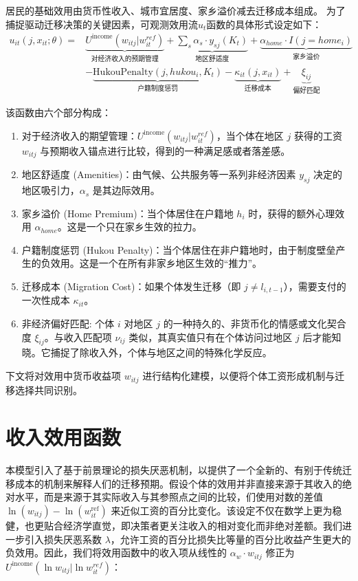 \documentclass[master, final]{zufe-thesis}
\begin{document}
居民的基础效用由货币性收入、城市宜居度、家乡溢价减去迁移成本组成。
为了捕捉驱动迁移决策的关键因素，可观测效用流$u_t$函数的具体形式设定如下：
\begin{equation}
\begin{split}
     u_{it}(j, x_{it}; \theta) = & \underbrace{ U^{\text{income}}(w_{itj} | w_{it}^{ref}) }_{\text{对经济收入的预期管理}} + \underbrace{\sum_s \alpha_s \cdot y_{sj}(K_t)}_{\text{地区舒适度}} + \underbrace{\alpha_{home} \cdot I(j=home_i)}_{\text{家乡溢价}} \\
    & - \underbrace{\text{HukouPenalty}(j, hukou_i, K_t)}_{\text{户籍制度惩罚}} - \underbrace{\kappa_{it}(j, x_{it})}_{\text{迁移成本}} + \underbrace{\xi_{ij}}_{\text{偏好匹配}}
\end{split}
\label{eq:确定性效用函数}
\end{equation}


该函数由六个部分构成：
\begin{enumerate}
  \item 对于经济收入的期望管理：$U^{\text{income}}(w_{itj} | w_{it}^{ref})$，当个体在地区 $j$ 获得的工资 $w_{itj}$ 与预期收入锚点进行比较，得到的一种满足感或者落差感。
  \item 地区舒适度 (Amenities)：由气候、公共服务等一系列非经济因素 $y_{sj}$ 决定的地区吸引力，$\alpha_s$ 是其边际效用。
  \item 家乡溢价 (Home Premium)：当个体居住在户籍地 $h_i$ 时，获得的额外心理效用 $\alpha_{home}$。这是一个只在家乡生效的拉力。
  \item 户籍制度惩罚 (Hukou Penalty)：当个体居住在非户籍地时，由于制度壁垒产生的负效用。这是一个在所有非家乡地区生效的“推力”。
  \item 迁移成本 (Migration Cost)：如果个体发生迁移（即 $j \neq l_{i,t-1}$），需要支付的一次性成本 $\kappa_{it}$。
  \item 非经济偏好匹配: 个体 $i$ 对地区 $j$ 的一种持久的、非货币化的情感或文化契合度 $\xi_{ij}$。与收入匹配项 $\nu_{ij}$ 类似，其真实值只有在个体访问过地区 $j$ 后才能知晓。它捕捉了除收入外，个体与地区之间的特殊化学反应。
\end{enumerate}

下文将对效用中货币收益项 $w_{itj}$ 进行结构化建模，以便将个体工资形成机制与迁移选择共同识别。

\section{收入效用函数}

本模型引入了基于前景理论的损失厌恶机制，以提供了一个全新的、有别于传统迁移成本的机制来解释人们的迁移预期。假设个体的效用并非直接来源于其收入的绝对水平，而是来源于其实际收入与其参照点之间的比较，们使用对数的差值 $\ln(w_{itj}) - \ln(w_{it}^{\text{ref}})$ 来近似工资的百分比变化。该设定不仅在数学上更为稳健，也更贴合经济学直觉，即决策者更关注收入的相对变化而非绝对差额。我们进一步引入损失厌恶系数 $\lambda$，允许工资的百分比损失比等量的百分比收益产生更大的负效用。因此，我们将效用函数中的收入项从线性的 $α_w \cdot w_{itj}$ 修正为 $U^{\text{income}}(\ln w_{itj} | \ln w_{it}^{ref})$：
\end{document}
